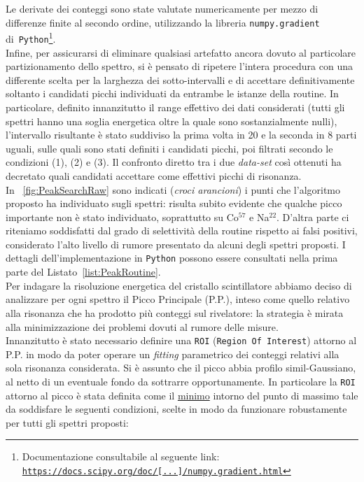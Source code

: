 \noindent Le derivate dei conteggi sono state valutate numericamente per mezzo di differenze finite al secondo ordine, utilizzando la libreria \texttt{numpy.gradient} di~\texttt{Python}\footnote{Documentazione consultabile al seguente link: \href{https://docs.scipy.org/doc/numpy-1.15.0/reference/generated/numpy.gradient.html}{\texttt{https://docs.scipy.org/doc/[...]/numpy.gradient.html}}}.\\

\noindent Infine, per assicurarsi di eliminare qualsiasi artefatto ancora dovuto al particolare partizionamento dello spettro, si è pensato di ripetere l'intera procedura con una differente scelta per la larghezza dei sotto-intervalli e di accettare definitivamente soltanto i candidati picchi individuati da entrambe le istanze della routine. In particolare, definito innanzitutto il range effettivo dei dati considerati (tutti gli spettri hanno una soglia energetica oltre la quale sono sostanzialmente nulli), l'intervallo risultante è stato suddiviso la prima volta in  20 e la seconda in 8 parti uguali, sulle quali sono stati definiti i candidati picchi, poi filtrati secondo le condizioni (1), (2) e (3). Il confronto diretto tra i due \emph{data-set} così ottenuti ha decretato quali candidati accettare come effettivi picchi di risonanza.\\

\noindent  In \figurename~\ref{fig:PeakSearchRaw} sono indicati (\textit{croci arancioni}) i punti che l'algoritmo proposto ha individuato sugli spettri: risulta subito evidente che qualche picco importante non è stato individuato, soprattutto su  Co$^{57}$ e Na$^{22}$. D'altra parte ci riteniamo soddisfatti dal grado di selettività della routine rispetto ai falsi positivi, considerato l'alto livello di rumore presentato da alcuni degli spettri proposti. I dettagli dell'implementazione in \texttt{Python} possono essere consultati nella prima parte del Listato~\ref{list:PeakRoutine}.\\

\noindent Per indagare la risoluzione energetica del cristallo scintillatore abbiamo deciso di analizzare per ogni spettro il Picco Principale (P.P.), inteso come quello relativo alla risonanza che ha prodotto più conteggi sul rivelatore: la strategia è mirata alla minimizzazione dei problemi dovuti al rumore delle misure.\\

\noindent Innanzitutto è stato necessario definire una \texttt{ROI} (\texttt{Region Of Interest}) attorno al P.P. in modo da poter operare un \emph{fitting} parametrico dei conteggi relativi alla sola risonanza considerata. Si è assunto che il picco abbia profilo simil-Gaussiano, al netto di un eventuale fondo da sottrarre opportunamente. In particolare la \texttt{ROI} attorno al picco è stata definita come il \underline{minimo} intorno del punto di massimo tale da soddisfare le seguenti condizioni, scelte in modo da funzionare robustamente per tutti gli spettri proposti:

